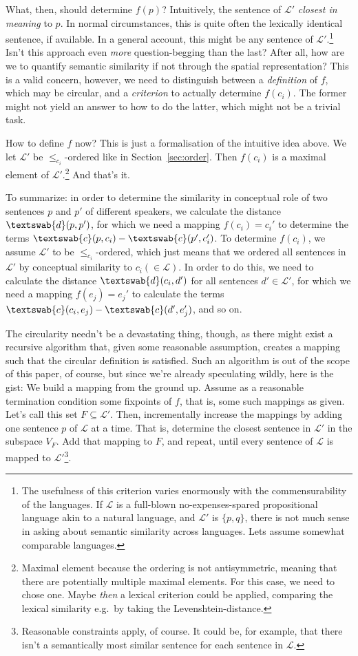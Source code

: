 \documentclass[11pt, a4paper]{scrartcl}
\renewcommand{\i}[1]{\emph{#1}}
\renewcommand{\L}{\mathcal{L}}
\newcommand{\m}[1]{\textswab{#1}}
\begin{document}
What, then, should determine $f(p)$? Intuitively, the sentence of $\L'$ \i{closest in meaning} to $p$. In normal circumstances, this is quite often the lexically identical sentence, if available. In a general account, this might be any sentence of $\L'$.\footnote{The usefulness of this criterion varies enormously with the commensurability of the languages. If $\L$ is a full-blown no-expenses-spared propositional language akin to a natural language, and $\L'$ is $\{p, q\}$, there is not much sense in asking about semantic similarity across languages. Lets assume somewhat comparable languages.} Isn't this approach even \i{more} question-begging than the last? After all, how are we to quantify semantic similarity if not through the spatial representation? This is a valid concern, however, we need to distinguish between a \i{definition} of $f$, which may be circular, and a \i{criterion} to actually determine $f(c_i)$. The former might not yield an answer to how to do the latter, which might not be a trivial task.

How to define $f$ now? This is just a formalisation of the intuitive idea above. 
We let $\L'$ be $\leqslant_{c_i}$-ordered like in Section~\ref{sec:order}. Then $f(c_i)$ is a maximal element of $\L'$.\footnote{Maximal element because the ordering is not antisymmetric, meaning that there are potentially multiple maximal elements. For this case, we need to chose one. Maybe \i{then} a lexical criterion could be applied, comparing the lexical similarity e.g.\ by taking the Levenshtein-distance.} And that's it. 

To summarize: in order to determine the similarity in conceptual role of two sentences $p$ and $p'$ of different speakers, we calculate the distance $\m{d}(p,p')$, for which we need a mapping $f(c_i) = c_i'$ to determine the terms $\m{c}(p,c_i) - \m{c}(p',c_i')$. To determine $f(c_i)$, we assume $\L'$ to be $\leqslant_{c_i}$-ordered, which just means that we ordered all sentences in $\L'$ by conceptual similarity to $c_i (\in \L)$. In order to do this, we need to calculate the distance $\m{d}(c_i,d')$ for all sentences $d' \in \L'$, for which we need a mapping $f(e_j) = e_j'$ to calculate the terms $\m{c}(c_i,e_j) - \m{c}(d',e_j')$, and so on.

The circularity needn't be a devastating thing, though, as there might exist a recursive algorithm that, given some reasonable assumption, creates a mapping such that the circular definition is satisfied. Such an algorithm is out of the scope of this paper, of course, but since we're already speculating wildly, here is the gist: We build a mapping from the ground up. Assume as a reasonable termination condition some fixpoints of $f$, that is, some such mappings as given. Let's call this set $F \subseteq \L'$. Then, incrementally increase the mappings by adding one sentence $p$ of $\L$ at a time. That is, determine the closest sentence in $\L'$ in the subspace $V_F$. Add that mapping to $F$, and repeat, until every sentence of $\L$ is mapped to $\L'$\footnote{Reasonable constraints apply, of course. It could be, for example, that there isn't a semantically most similar sentence for each sentence in $\L$.}.   
\end{document}
